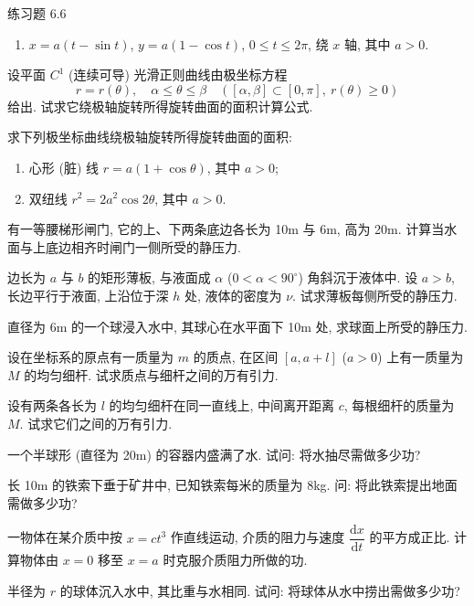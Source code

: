 \begin{exblock}{练习题 6.6}
\begin{enumerate}[label=(\arabic*)]
\item $x=a(t-\sin t)$, $y=a(1-\cos t)$, $0\leqslant t\leqslant2\pi$, 绕 $x$ 轴, 其中 $a>0$.
\end{enumerate}
\item 设平面 $C^{1}$ (连续可导) 光滑正则曲线由极坐标方程
\[
r=r(\theta),\quad\alpha\leqslant\theta\leqslant\beta\quad([\alpha,\beta]\subset[0,\pi],\ r(\theta)\geqslant0)
\]
给出. 试求它绕极轴旋转所得旋转曲面的面积计算公式.
\item 求下列极坐标曲线绕极轴旋转所得旋转曲面的面积:
\begin{enumerate}[label=(\arabic*)]
\item 心形 (脏) 线 $r=a(1+\cos\theta)$, 其中 $a>0$;
\item 双纽线 $r^{2}=2a^{2}\cos2\theta$, 其中 $a>0$.
\end{enumerate}
\item 有一等腰梯形闸门, 它的上、下两条底边各长为 10m 与 6m, 高为 20m. 计算当水面与上底边相齐时闸门一侧所受的静压力.
\item 边长为 $a$ 与 $b$ 的矩形薄板, 与液面成 $\alpha$ ($0<\alpha<90^{\circ}$) 角斜沉于液体中. 设 $a>b$, 长边平行于液面, 上沿位于深 $h$ 处, 液体的密度为 $\nu$. 试求薄板每侧所受的静压力.
\item 直径为 6m 的一个球浸入水中, 其球心在水平面下 10m 处, 求球面上所受的静压力.
\item 设在坐标系的原点有一质量为 $m$ 的质点, 在区间 $[a,a+l]$ ($a>0$) 上有一质量为 $M$ 的均匀细杆. 试求质点与细杆之间的万有引力.
\item 设有两条各长为 $l$ 的均匀细杆在同一直线上, 中间离开距离 $c$, 每根细杆的质量为 $M$. 试求它们之间的万有引力.
\item 一个半球形 (直径为 20m) 的容器内盛满了水. 试问: 将水抽尽需做多少功?
\item 长 10m 的铁索下垂于矿井中, 已知铁索每米的质量为 8kg. 问: 将此铁索提出地面需做多少功?
\item 一物体在某介质中按 $x=ct^{3}$ 作直线运动, 介质的阻力与速度 $\dfrac{\mathrm{d}x}{\mathrm{d}t}$ 的平方成正比. 计算物体由 $x=0$ 移至 $x=a$ 时克服介质阻力所做的功.
\item 半径为 $r$ 的球体沉入水中, 其比重与水相同. 试问: 将球体从水中捞出需做多少功?
\end{exblock}

